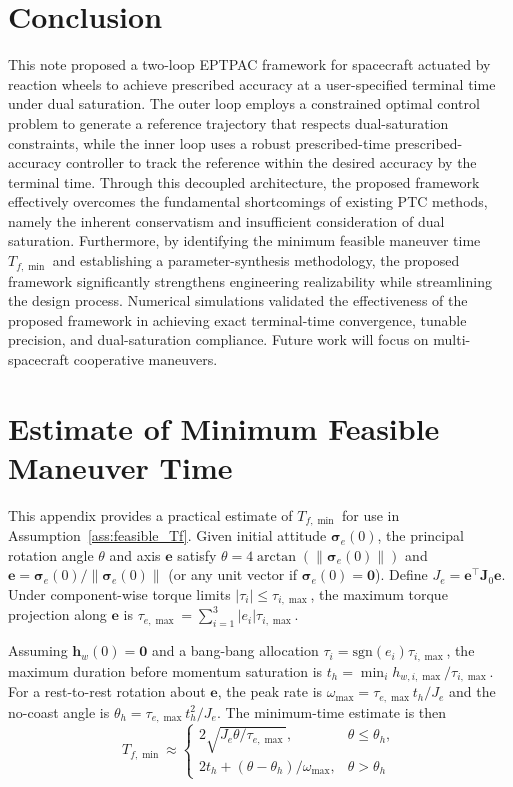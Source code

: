 \documentclass[journal]{new-aiaa}
\begin{document}
\section{Conclusion}
\label{section:conclusion}
This note proposed a two-loop EPTPAC framework for spacecraft actuated by reaction wheels to achieve prescribed accuracy at a user-specified terminal time under dual saturation.
The outer loop employs a constrained optimal control problem to generate a reference trajectory that respects dual-saturation constraints, while the inner loop uses a robust prescribed-time prescribed-accuracy controller to track the reference within the desired accuracy by the terminal time.
Through this decoupled architecture, the proposed framework effectively overcomes the fundamental shortcomings of existing PTC methods, namely the inherent conservatism and insufficient consideration of dual saturation. Furthermore, by identifying the minimum feasible maneuver time $T_{f,\min}$ and establishing a parameter-synthesis methodology, the proposed framework significantly strengthens engineering realizability while streamlining the design process.
Numerical simulations validated the effectiveness of the proposed framework in achieving exact terminal-time convergence, tunable precision, and dual-saturation compliance.
Future work will focus on multi-spacecraft cooperative maneuvers.

\appendix
\section{Estimate of Minimum Feasible Maneuver Time}
\label{app:bangbang}

This appendix provides a practical estimate of $T_{f,\min}$ for use in Assumption~\ref{ass:feasible_Tf}.
Given initial attitude $\boldsymbol{\sigma}_e(0)$, the principal rotation angle $\theta$ and axis $\boldsymbol{e}$ satisfy
$\theta = 4\arctan(\|\boldsymbol{\sigma}_e(0)\|)$ and
$\boldsymbol{e} = \boldsymbol{\sigma}_e(0)/\|\boldsymbol{\sigma}_e(0)\|$ (or any unit vector if $\boldsymbol{\sigma}_e(0)=\boldsymbol{0}$).
Define $J_e = \boldsymbol{e}^\top\boldsymbol{J}_0\boldsymbol{e}$.
Under component-wise torque limits $|\tau_i|\le\tau_{i,\max}$, the maximum torque projection along $\boldsymbol{e}$ is
$\tau_{e,\max}= \sum_{i=1}^{3}|e_i|\tau_{i,\max}$.

Assuming $\boldsymbol{h}_w(0)=\boldsymbol{0}$ and a bang-bang allocation $\tau_i=\mathrm{sgn}(e_i)\tau_{i,\max}$,
the maximum duration before momentum saturation is
$t_h = \min_i h_{w,i,\max}/\tau_{i,\max}$.
For a rest-to-rest rotation about $\boldsymbol{e}$,
the peak rate is $\omega_{\max}= \tau_{e,\max}t_h/J_e$
and the no-coast angle is $\theta_h = \tau_{e,\max}t_h^2/J_e$.
The minimum-time estimate is then
\begin{equation}
T_{f,\min}\approx
\begin{cases}
2\sqrt{J_e\theta/\tau_{e,\max}}, & \theta \le \theta_h,\\[6pt]
2t_h + (\theta-\theta_h)/\omega_{\max}, & \theta > \theta_h
\end{cases}
\label{eq:app_Tmin_piecewise}
\end{equation}
\end{document}
